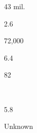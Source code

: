 \begin{description}[font=\normalfont,style=nextline]
\begin{multicols}{2}
\begin{description}[font=\normalfont\itshape,noitemsep]
\item[\nativespeakers] 43 mil. 
 \item[\region] \regionIndonesia 
 \end{description}\end{multicols}
\item[\langnameIrish] 
 \begin{multicols}{2}\begin{description}[font=\normalfont\itshape,noitemsep] 
 \item[] 
 \item[\pbnumberabbr] 2.6 
 \item[\family] \famIndoEuropean 
 \item[]
\item[\nativespeakers] 72,000 
 \item[\region] \regionIreland 
 \end{description}\end{multicols}
\item[\langnameItelmen] 
 \begin{multicols}{2}\begin{description}[font=\normalfont\itshape,noitemsep] 
 \item[] 
 \item[\pbnumberabbr] 6.4 
 \item[\family] \famChukotkoKamtchatkan
 \item[]
 \item[]
\item[\nativespeakers] 82 
 \item[\region] \regionKamchatka\ \Brackets{\regionRussia}
 \end{description}\end{multicols}
\item[\langnameJale] 
 \begin{multicols}{2}\begin{description}[font=\normalfont\itshape,noitemsep] 
 \item[] 
 \item[\pbnumberabbr] 5.8 
 \item[\family] \famTNG 
 \item[]
\item[\nativespeakers] Unknown 
 \item[\region] \regionNewGuinea 
 \end{description}\end{multicols}
\item[\langnameJapanese] 
 \begin{multicols}{2}\begin{description}[font=\normalfont\itshape,noitemsep] 

\end{description}
\end{multicols}
\end{description}
